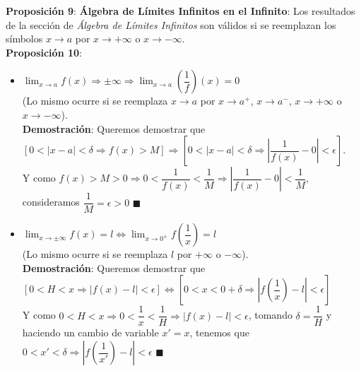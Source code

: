\documentclass[11pt,a4paper]{article}
\newcommand*{\QEDA}{\null\nobreak\hfill\ensuremath{\blacksquare}}
\begin{document}
\noindent \textbf{Proposici\'on 9}: \textbf{\'Algebra de L\'imites Infinitos en el Infinito}: Los resultados de la secci\'on de \textit{\'Algebra de L\'imites Infinitos} son v\'alidos si se reemplazan los s\'imbolos $x\to a$ por $x\to +\infty$ o $x\to -\infty$.\\


\noindent \textbf{Proposici\'on 10}:
\begin{itemize}
\item $\displaystyle{\lim_{x \to a} f(x) \Rightarrow \pm\infty} \Rightarrow \displaystyle{\lim_{x \to a} \left(\dfrac{1}{f}\right)(x) = 0}$ \\ (Lo mismo ocurre si se reemplaza $x\to a$ por $x\to a^+$, $x\to a^-$, $x\to +\infty$ o $x\to -\infty$).\\
\textbf{Demostraci\'on}: Queremos demostrar que\\ $\left[0<|x-a|<\delta \Rightarrow f(x) > M \right] \Rightarrow \left[0<|x-a|<\delta \Rightarrow \left|\dfrac{1}{f(x)}-0\right|<\epsilon\right]$. \\
Y como $f(x)>M>0 \Rightarrow 0 <\dfrac{1}{f(x)}<\dfrac{1}{M} \Rightarrow \left|\dfrac{1}{f(x)}-0\right| < \dfrac{1}{M}$, consideramos $\dfrac{1}{M} = \epsilon > 0$ \QEDA\\

\item $\displaystyle{\lim_{x \to \pm\infty} f(x) = l} \iff \displaystyle{\lim_{x \to 0^\pm} f\left(\dfrac{1}{x}\right) = l}$ \\ (Lo mismo ocurre si se reemplaza $l$ por $+\infty$ o $-\infty$).\\
\textbf{Demostraci\'on}: Queremos demostrar que\\ $\left[ 0<H<x \Rightarrow |f(x)-l| < \epsilon \right] \iff \left[ 0 < x < 0 + \delta  \Rightarrow \left|f\left(\dfrac{1}{x}\right)-l\right| < \epsilon \right]$\\
Y como $0<H<x \Rightarrow 0<\dfrac{1}{x} < \dfrac{1}{H} \Rightarrow |f(x)-l|<\epsilon$, tomando $\delta = \dfrac{1}{H}$ y haciendo un cambio de variable $x'=x$, tenemos que $0< x' < \delta \Rightarrow \left|f\left(\dfrac{1}{x'}\right)-l\right|<\epsilon$ \QEDA
\end{itemize}
\end{document}
